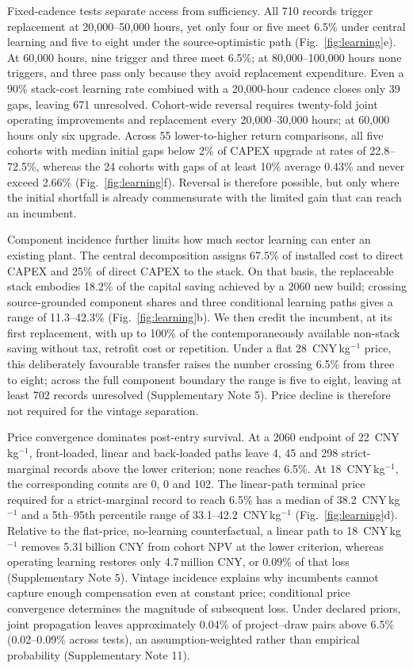 \documentclass[lineno,pdflatex,sn-nature]{sn-jnl}
\newcommand{\cnykg}{CNY\,kg$^{-1}$}
\begin{document}
Fixed-cadence tests separate access from sufficiency. All 710 records trigger replacement at 20,000--50,000 hours, yet only four or five meet 6.5\% under central learning and five to eight under the source-optimistic path (Fig.~\ref{fig:learning}e). At 60,000 hours, nine trigger and three meet 6.5\%; at 80,000--100,000 hours none triggers, and three pass only because they avoid replacement expenditure. Even a 90\% stack-cost learning rate combined with a 20,000-hour cadence closes only 39 gaps, leaving 671 unresolved. Cohort-wide reversal requires twenty-fold joint operating improvements and replacement every 20,000--30,000 hours; at 60,000 hours only six upgrade. Across 55 lower-to-higher return comparisons, all five cohorts with median initial gaps below 2\% of CAPEX upgrade at rates of 22.8--72.5\%, whereas the 24 cohorts with gaps of at least 10\% average 0.43\% and never exceed 2.66\% (Fig.~\ref{fig:learning}f). Reversal is therefore possible, but only where the initial shortfall is already commensurate with the limited gain that can reach an incumbent.

Component incidence further limits how much sector learning can enter an existing plant. The central decomposition assigns 67.5\% of installed cost to direct CAPEX and 25\% of direct CAPEX to the stack. On that basis, the replaceable stack embodies 18.2\% of the capital saving achieved by a 2060 new build; crossing source-grounded component shares and three conditional learning paths gives a range of 11.3--42.3\% (Fig.~\ref{fig:learning}b). We then credit the incumbent, at its first replacement, with up to 100\% of the contemporaneously available non-stack saving without tax, retrofit cost or repetition. Under a flat 28~\cnykg{} price, this deliberately favourable transfer raises the number crossing 6.5\% from three to eight; across the full component boundary the range is five to eight, leaving at least 702 records unresolved (Supplementary Note 5). Price decline is therefore not required for the vintage separation.

Price convergence dominates post-entry survival. At a 2060 endpoint of 22~\cnykg{}, front-loaded, linear and back-loaded paths leave 4, 45 and 298 strict-marginal records above the lower criterion; none reaches 6.5\%. At 18~\cnykg{}, the corresponding counts are 0, 0 and 102. The linear-path terminal price required for a strict-marginal record to reach 6.5\% has a median of 38.2~\cnykg{} and a 5th--95th percentile range of 33.1--42.2~\cnykg{} (Fig.~\ref{fig:learning}d). Relative to the flat-price, no-learning counterfactual, a linear path to 18~\cnykg{} removes 5.31\,billion CNY from cohort NPV at the lower criterion, whereas operating learning restores only 4.7\,million CNY, or 0.09\% of that loss (Supplementary Note 5). Vintage incidence explains why incumbents cannot capture enough compensation even at constant price; conditional price convergence determines the magnitude of subsequent loss. Under declared priors, joint propagation leaves approximately 0.04\% of project--draw pairs above 6.5\% (0.02--0.09\% across tests), an assumption-weighted rather than empirical probability (Supplementary Note 11).
\end{document}
